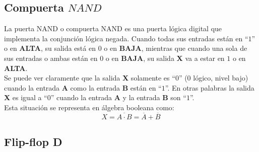 \documentclass[twocolumn]{IEEEtran}
\begin{document}
\subsection{Compuerta $NAND$}
\noindent
La puerta NAND o compuerta NAND es una puerta lógica digital que implementa la conjunción lógica negada. Cuando todas sus entradas están en ``$1$'' o en {\bf ALTA}, su salida está en $0$ o en {\bf BAJA}, mientras que cuando una sola de sus entradas o ambas están en $0$ o en {\bf BAJA}, su salida {\bf X} va a estar en $1$ o en {\bf ALTA}.\\
Se puede ver claramente que la salida {\bf X} solamente es ``$0$'' ($0$ lógico, nivel bajo) cuando la entrada {\bf A} como la entrada {\bf B} están en ``$1$''. En otras palabras la salida {\bf X} es igual a ``$0$'' cuando la entrada {\bf A} y la entrada {\bf B} son ``$1$''.\\
Esta situación se representa en álgebra booleana como:
\begin{equation}
 X = \overline {A \cdot B}  = \overline A  + \overline B
 \label{ecu2}
\end{equation}

\subsection{Flip-flop D}
\noindent
\end{document}
